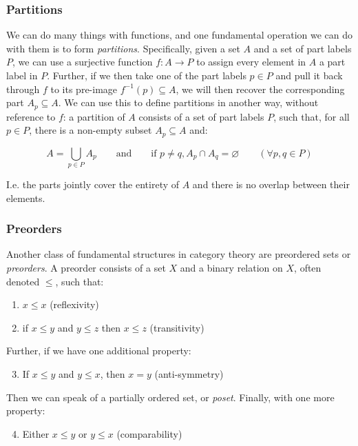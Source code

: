 \documentclass[12pt,a4paper]{article}
\begin{document}
\subsubsection{Partitions}

We can do many things with functions, and one fundamental operation we can do with them is to form \textit{partitions}. Specifically, given a set $A$ and a set of part labels $P$, we can use a surjective function $f: A \to P$ to assign every element in $A$ a part label in $P$. Further, if we then take one of the part labels $p \in P$ and pull it back through $f$ to its pre-image $f^{-1}(p) \subseteq A$, we will then recover the corresponding part $A_p \subseteq A$. We can use this to define partitions in another way, without reference to $f$: a partition of $A$ consists of a set of part labels $P$, such that, for all $p \in P$, there is a non-empty subset $A_p \subseteq A$ and:

$$A = \bigcup_{p \in P} A_p \qquad \text{and} \qquad \text{if } p \neq q, A_p \cap A_q = \varnothing \qquad (\forall p, q \in P)$$

I.e. the parts jointly cover the entirety of $A$ and there is no overlap between their elements.

\subsubsection{Preorders}

Another class of fundamental structures in category theory are preordered sets or \textit{preorders}. A preorder consists of a set $X$ and a binary relation on $X$, often denoted $\leq$, such that:

\begin{enumerate}
\item $x \leq x$ (reflexivity)
\item if $x \leq y$ and $y \leq z$ then $x \leq z$ (transitivity)
\end{enumerate}

Further, if we have one additional property:

\begin{enumerate}
\setcounter{enumi}{2}
\item If $x \leq y$ and $y \leq x$, then $x = y$ (anti-symmetry)
\end{enumerate}

Then we can speak of a partially ordered set, or \textit{poset}. Finally, with one more property:

\begin{enumerate}
\setcounter{enumi}{3}
\item Either $x \leq y$ or $y \leq x$ (comparability)
\end{enumerate}
\end{document}
